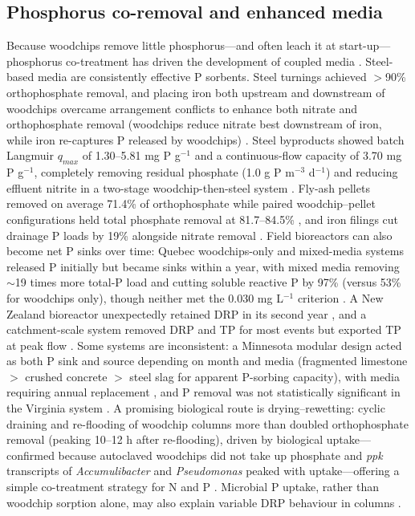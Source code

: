 \subsection{Phosphorus co-removal and enhanced media}

Because woodchips remove little phosphorus---and often leach it at start-up---phosphorus co-treatment has driven the development of coupled media \parencite{Christianson2021}. Steel-based media are consistently effective P sorbents. Steel turnings achieved $>$90\% orthophosphate removal, and placing iron both upstream and downstream of woodchips overcame arrangement conflicts to enhance both nitrate and orthophosphate removal (woodchips reduce nitrate best downstream of iron, while iron re-captures P released by woodchips) \parencite{Goodwin2015}. Steel byproducts showed batch Langmuir $q_{max}$ of 1.30--5.81 mg P g$^{-1}$ and a continuous-flow capacity of 3.70 mg P g$^{-1}$, completely removing residual phosphate (1.0 g P m$^{-3}$ d$^{-1}$) and reducing effluent nitrite in a two-stage woodchip-then-steel system \parencite{Hua2016}. Fly-ash pellets removed on average 71.4\% of orthophosphate while paired woodchip--pellet configurations held total phosphate removal at 81.7--84.5\% \parencite{Li2018b}, and iron filings cut drainage P loads by 19\% alongside nitrate removal \parencite{Oladeji2023}. Field bioreactors can also become net P sinks over time: Quebec woodchips-only and mixed-media systems released P initially but became sinks within a year, with mixed media removing $\sim$19 times more total-P load and cutting soluble reactive P by 97\% (versus 53\% for woodchips only), though neither met the 0.030 mg L$^{-1}$ criterion \parencite{Husk2018}. A New Zealand bioreactor unexpectedly retained DRP in its second year \parencite{Rivas2020}, and a catchment-scale system removed DRP and TP for most events but exported TP at peak flow \parencite{Feyereisen2023}. Some systems are inconsistent: a Minnesota modular design acted as both P sink and source depending on month and media (fragmented limestone $>$ crushed concrete $>$ steel slag for apparent P-sorbing capacity), with media requiring annual replacement \parencite{Strock2025}, and P removal was not statistically significant in the Virginia system \parencite{Bock2018}. A promising biological route is drying--rewetting: cyclic draining and re-flooding of woodchip columns more than doubled orthophosphate removal (peaking 10--12 h after re-flooding), driven by biological uptake---confirmed because autoclaved woodchips did not take up phosphate and \textit{ppk} transcripts of \textit{Accumulibacter} and \textit{Pseudomonas} peaked with uptake---offering a simple co-treatment strategy for N and P \parencite{Zhang2024b}. Microbial P uptake, rather than woodchip sorption alone, may also explain variable DRP behaviour in columns \parencite{Soupir2018}.

